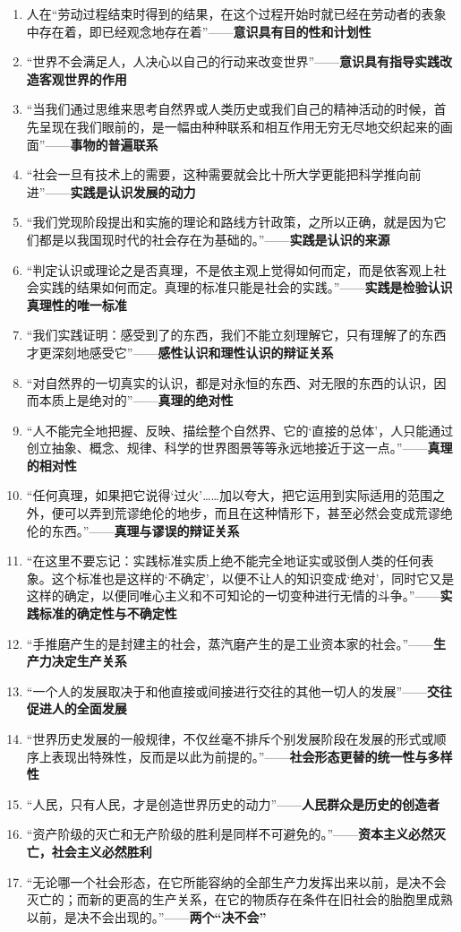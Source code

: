 \documentclass[12pt, a4paper, oneside]{ctexbook}
\begin{document}
\begin{enumerate}
\item 人在“劳动过程结束时得到的结果，在这个过程开始时就已经在劳动者的表象中存在着，即已经观念地存在着”——\textbf{意识具有目的性和计划性}
\item “世界不会满足人，人决心以自己的行动来改变世界”——\textbf{意识具有指导实践改造客观世界的作用}
\item “当我们通过思维来思考自然界或人类历史或我们自己的精神活动的时候，首先呈现在我们眼前的，是一幅由种种联系和相互作用无穷无尽地交织起来的画面”——\textbf{事物的普遍联系}
\item “社会一旦有技术上的需要，这种需要就会比十所大学更能把科学推向前进”——\textbf{实践是认识发展的动力}
\item “我们党现阶段提出和实施的理论和路线方针政策，之所以正确，就是因为它们都是以我国现时代的社会存在为基础的。”——\textbf{实践是认识的来源}
\item “判定认识或理论之是否真理，不是依主观上觉得如何而定，而是依客观上社会实践的结果如何而定。真理的标准只能是社会的实践。”——\textbf{实践是检验认识真理性的唯一标准}
\item “我们实践证明：感受到了的东西，我们不能立刻理解它，只有理解了的东西才更深刻地感受它”——\textbf{感性认识和理性认识的辩证关系}
\item “对自然界的一切真实的认识，都是对永恒的东西、对无限的东西的认识，因而本质上是绝对的”——\textbf{真理的绝对性}
\item “人不能完全地把握、反映、描绘整个自然界、它的‘直接的总体’，人只能通过创立抽象、概念、规律、科学的世界图景等等永远地接近于这一点。”——\textbf{真理的相对性}
\item “任何真理，如果把它说得‘过火’……加以夸大，把它运用到实际适用的范围之外，便可以弄到荒谬绝伦的地步，而且在这种情形下，甚至必然会变成荒谬绝伦的东西。”——\textbf{真理与谬误的辩证关系}
\item “在这里不要忘记：实践标准实质上绝不能完全地证实或驳倒人类的任何表象。这个标准也是这样的‘不确定’，以便不让人的知识变成‘绝对’，同时它又是这样的确定，以便同唯心主义和不可知论的一切变种进行无情的斗争。”——\textbf{实践标准的确定性与不确定性}
\item “手推磨产生的是封建主的社会，蒸汽磨产生的是工业资本家的社会。”——\textbf{生产力决定生产关系}
\item “一个人的发展取决于和他直接或间接进行交往的其他一切人的发展”——\textbf{交往促进人的全面发展}
\item “世界历史发展的一般规律，不仅丝毫不排斥个别发展阶段在发展的形式或顺序上表现出特殊性，反而是以此为前提的。”——\textbf{社会形态更替的统一性与多样性}
\item “人民，只有人民，才是创造世界历史的动力”——\textbf{人民群众是历史的创造者}
\item “资产阶级的灭亡和无产阶级的胜利是同样不可避免的。”——\textbf{资本主义必然灭亡，社会主义必然胜利}
\item “无论哪一个社会形态，在它所能容纳的全部生产力发挥出来以前，是决不会灭亡的；而新的更高的生产关系，在它的物质存在条件在旧社会的胎胞里成熟以前，是决不会出现的。”——\textbf{两个“决不会”}
\end{enumerate}
\end{document}
